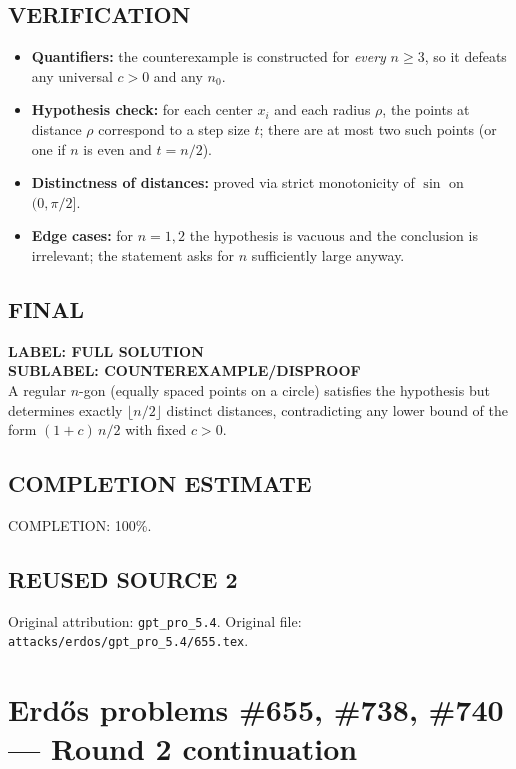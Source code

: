 \subsection*{VERIFICATION}
\begin{itemize}[leftmargin=*]
\item \textbf{Quantifiers:} the counterexample is constructed for \emph{every} $n\ge 3$, so it defeats any universal $c>0$ and any $n_0$.
\item \textbf{Hypothesis check:} for each center $x_i$ and each radius $\rho$, the points at distance $\rho$ correspond to a step size $t$; there are at most two such points (or one if $n$ is even and $t=n/2$).
\item \textbf{Distinctness of distances:} proved via strict monotonicity of $\sin$ on $(0,\pi/2]$.
\item \textbf{Edge cases:} for $n=1,2$ the hypothesis is vacuous and the conclusion is irrelevant; the statement asks for $n$ sufficiently large anyway.
\end{itemize}

\subsection*{FINAL}
\textbf{LABEL: FULL SOLUTION}\\
\textbf{SUBLABEL: COUNTEREXAMPLE/DISPROOF}\\
A regular $n$-gon (equally spaced points on a circle) satisfies the hypothesis but determines exactly $\lfloor n/2\rfloor$ distinct distances, contradicting any lower bound of the form $(1+c)\,n/2$ with fixed $c>0$.

\subsection*{COMPLETION ESTIMATE}
COMPLETION: 100\%.




\subsection*{REUSED SOURCE 2}
Original attribution: \texttt{gpt\_pro\_5.4}.
Original file: \texttt{attacks/erdos/gpt\_pro\_5.4/655.tex}.

\section{Erd\H{o}s problems \#655, \#738, \#740 --- Round 2 continuation}

